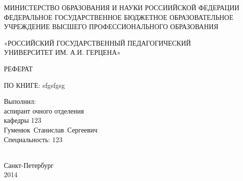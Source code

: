 \thispagestyle{empty}

\begin{center}
МИНИСТЕРСТВО ОБРАЗОВАНИЯ И НАУКИ РОССИИЙСКОЙ ФЕДЕРАЦИИ\\
ФЕДЕРАЛЬНОЕ ГОСУДАРСТВЕННОЕ БЮДЖЕТНОЕ ОБРАЗОВАТЕЛЬНОЕ\\
УЧРЕЖДЕНИЕ ВЫСШЕГО ПРОФЕССИОНАЛЬНОГО ОБРАЗОВАНИЯ\par 

«РОССИЙСКИЙ ГОСУДАРСТВЕННЫЙ ПЕДАГОГИЧЕСКИЙ\\
УНИВЕРСИТЕТ ИМ. А.И. ГЕРЦЕНА» 
\par
\end{center}



\vspace{50mm}

\begin{center}
РЕФЕРАТ 

ПО КНИГЕ: sfgsfgsg



\end{center}

\vspace{20mm}
\begin{flushright}
\begin{minipage}
{0.4\textwidth} 
Выполнил:\\
аспирант очного отделения\\
кафедры 123\\
Гуменюк~Станислав~Сергеевич\\ 
Специальность: 123\\
\\[0.3cm] 
\end{minipage}

\end{flushright}

\vfill
\begin{center}
{Санкт-Петербург \\ 2014}
\end{center}

\newpage